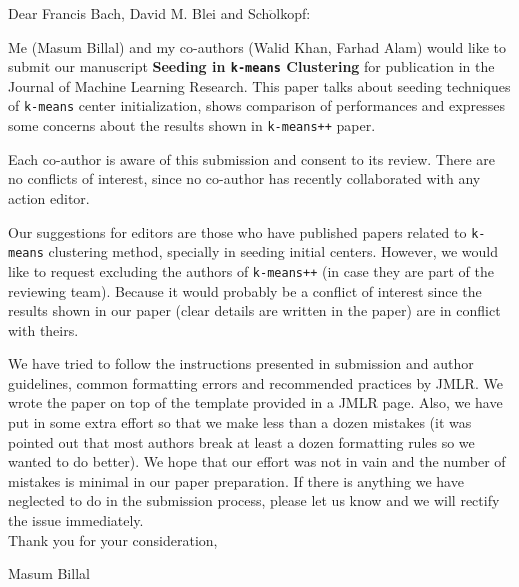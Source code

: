 \documentclass[twoside,11pt]{article} %
\begin{document}
	\noindent Dear Francis Bach, David M. Blei and Sch$\ddot{\mbox{o}}$lkopf: \\
	\medskip
	
	Me (Masum Billal) and my co-authors (Walid Khan, Farhad Alam) would like to submit our manuscript \textbf{Seeding in \texttt{k-means} Clustering} for publication in the Journal of Machine Learning Research. This paper talks about seeding techniques of \texttt{k-means} center initialization, shows comparison of performances and expresses some concerns about the results shown in \texttt{k-means++} paper.\\
	\medskip
	
	Each co-author is aware of this submission and consent to its review.  There are no conflicts of interest, since no co-author has recently collaborated with any action editor.
	\\
	\medskip
	
	Our suggestions for editors are those who have published papers related to \texttt{k-means} clustering method, specially in seeding initial centers. However, we would like to request excluding the authors of \texttt{k-means++} (in case they are part of the reviewing team). Because it would probably be a conflict of interest since the results shown in our paper (clear details are written in the paper) are in conflict with theirs.\\
	\medskip
	
	We have tried to follow the instructions presented in submission and author guidelines, common formatting errors and recommended practices by JMLR. We wrote the paper on top of the template provided in a JMLR page. Also, we have put in some extra effort so that we make less than a dozen mistakes (it was pointed out that most authors break at least a dozen formatting rules so we wanted to do better). We hope that our effort was not in vain and the number of mistakes is minimal in our paper preparation. If there is anything we have neglected to do in the submission process, please let us know and we will rectify the issue immediately. \\
	
	\medskip
	\noindent Thank you for your consideration, \\
	\medskip
	
	\noindent Masum Billal
\end{document}
